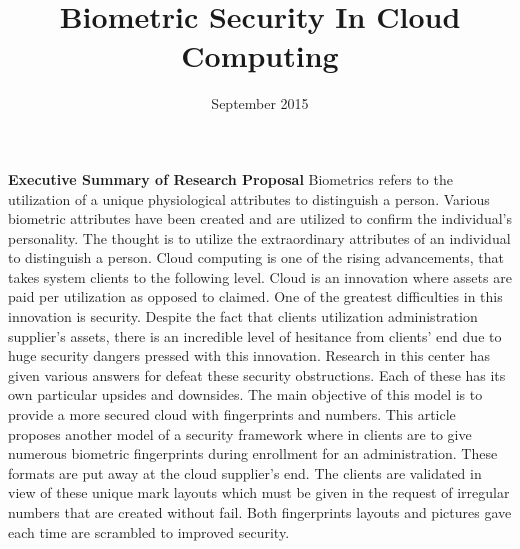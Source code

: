 \documentclass[12pt]{article}
\title{Biometric Security In Cloud Computing}
\date{September 2015}
\begin{document}
\begin{titlepage}
\maketitle
\end{titlepage}

\textbf{\large Executive Summary of Research Proposal} \newline \newline \newline
Biometrics refers to the utilization of a unique physiological attributes to distinguish a person. Various biometric attributes have been created and are utilized to confirm the individual's personality. The thought is to utilize the extraordinary attributes of an individual to distinguish a person. Cloud computing is one of the rising advancements, that takes system clients to the following level. Cloud is an innovation where assets are paid per utilization as opposed to claimed. One of the greatest difficulties in this innovation is security. Despite the fact that clients utilization administration supplier's assets, there is an incredible level of hesitance from clients' end due to huge security dangers pressed with this innovation. Research in this center has given various answers for defeat these security obstructions. Each of these has its own particular upsides and downsides. The main objective of this model is to provide a more secured cloud with fingerprints and numbers. This article proposes another model of a security framework where in clients are to give numerous biometric fingerprints during enrollment for an administration. These formats are put away at the cloud supplier's end. The clients are validated in view of these unique mark layouts which must be given in the request of irregular numbers that are created without fail. Both fingerprints layouts and pictures gave each time are scrambled to improved security. \newpage
\end{document}
